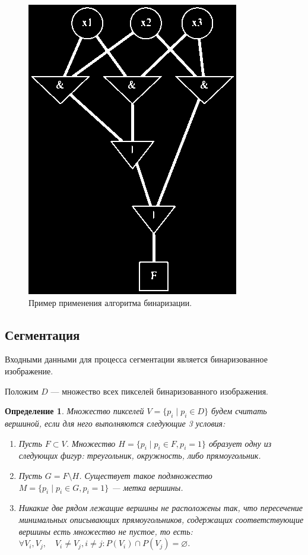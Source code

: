 \documentclass[makeidx, a4paper, 14pt]{extarticle}
\newtheorem{definition}{Определение}
\begin{document}
\begin{figure}[H]
    \centering
    \includegraphics[scale=0.75]{img4_binary.png}
    \caption{Пример применения алгоритма бинаризации.}
\end{figure}

\subsection{Сегментация}

Входными данными для процесса сегментации является бинаризованное изображение.

Положим $D$ --- множество всех пикселей бинаризованного изображения.

\begin{definition}
    Множество пикселей ${V = \{p_i \mid p_i \in D\}}$ будем считать вершиной, если для него выполняются следующие 3 условия:
    \begin{enumerate}
        \item Пусть ${F \subset V}$. Множество ${H = \{p_i \mid p_i \in F, p_i=1\}}$ образует одну из следующих фигур: треугольник, окружность, либо прямоугольник.
        \item Пусть ${G = F \setminus H}$. Существует такое подмножество \\
              ${M=\{p_i \mid p_i \in G, p_i=1\}}$ --- метка вершины.
        \item Никакие две рядом лежащие вершины не расположены так,
              что пересечение минимальных описывающих прямоугольников,
              содержащих соответствующие вершины есть множество не пустое, то есть: \\
              ${\forall V_i, V_j, \quad V_i \neq V_j, i \neq j: P(V_i) \cap P(V_j) = \varnothing}$.
    \end{enumerate}
\end{definition}
\end{document}

